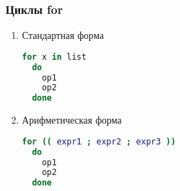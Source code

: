 \begin{frame}[fragile]
  \frametitle{Циклы for}
  \begin{enumerate}
    \item Стандартная форма
\begin{lstlisting}[language=sh,frame=single]
  for x in list 
  do
    op1
    op2
  done
\end{lstlisting}
    \item Арифметическая форма
\begin{lstlisting}[language=sh,frame=single]
  for (( expr1 ; expr2 ; expr3 )) 
  do 
    op1
    op2
  done
\end{lstlisting}
  \end{enumerate}
\end{frame}
